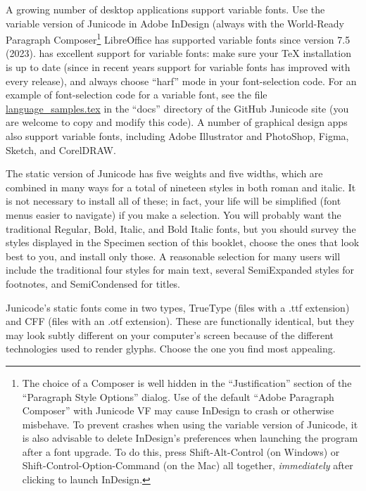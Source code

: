 A growing number of desktop applications support variable fonts. Use the variable version of
Junicode in Adobe InDesign (always with the World-Ready Paragraph Composer\footnote{%
The choice of a Composer is well hidden in the “Justification” section of the
“Paragraph Style Options” dialog. Use of the default “Adobe Paragraph Composer”
with Junicode VF may cause InDesign to crash or otherwise misbehave. To prevent crashes
when using the variable version of Junicode,
it is also advisable to delete InDesign's preferences when launching the program after
a font upgrade. To do this, press Shift-Alt-Control (on Windows) or
Shift-Control-Option-Command (on the Mac) all together, \textit{immediately} after
clicking to launch InDesign.} LibreOffice
has supported variable fonts since version 7.5 (2023). {\LuaTeX} has excellent support
for variable fonts: make sure your TeX installation is up to date (since in
recent years support for variable fonts has improved with every release), and always choose “harf”
mode in your font-selection code. For an example of font-selection code for a
variable font, see the file
\href{https://github.com/psb1558/Junicode-font/blob/master/docs/language_samples.tex}%
{language\_samples.tex} in the “docs” directory of the GitHub Junicode site (you
are welcome to copy and modify this code). A number of graphical design apps 
also support variable fonts, including Adobe Illustrator and PhotoShop, Figma,
Sketch, and CorelDRAW.

The static version of Junicode has five weights and five widths, which are combined in many ways
for a total of nineteen styles in
both roman and italic. It is not necessary to install all of these; in fact,
your life will be simplified (font menus easier to navigate) if you
make a selection. You will probably want the traditional Regular, Bold, Italic, and Bold
Italic fonts, but you should survey the styles displayed in the Specimen
section of this booklet, choose the ones that look best to you, and install
only those. A reasonable selection for many users will include the traditional four
styles for main text, several SemiExpanded styles for footnotes, and
SemiCondensed for titles.

Junicode’s static fonts come in two types, TrueType (files with a .ttf extension) and
CFF (files with an .otf extension). These are functionally identical, but they may look
subtly different on your computer’s screen because of the different technologies used to
render glyphs. Choose the one you find most appealing.

